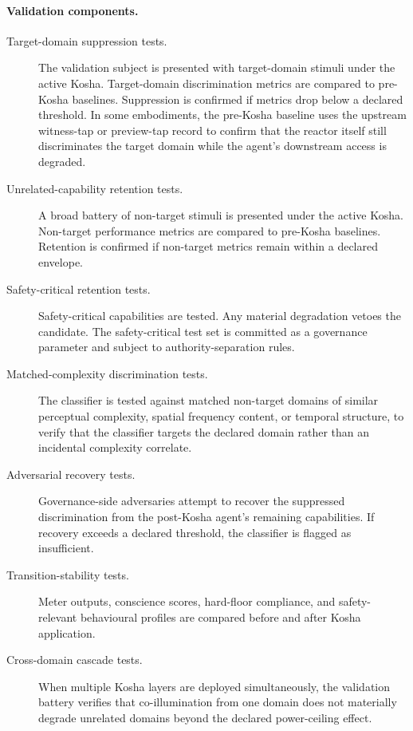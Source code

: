 \documentclass[a4paper,12pt]{article}
\begin{document}
\paragraph{Validation components.}
\begin{description}
  \item[Target-domain suppression tests.] The validation subject is
    presented with target-domain stimuli under the active Kosha.
    Target-domain discrimination metrics are compared to pre-Kosha
    baselines. Suppression is confirmed if metrics drop below a
    declared threshold. In some embodiments, the pre-Kosha baseline
    uses the upstream witness-tap or preview-tap record to confirm
    that the reactor itself still discriminates the target domain
    while the agent's downstream access is degraded.
  \item[Unrelated-capability retention tests.] A broad battery of
    non-target stimuli is presented under the active Kosha.
    Non-target performance metrics are compared to pre-Kosha
    baselines. Retention is confirmed if non-target metrics remain
    within a declared envelope.
  \item[Safety-critical retention tests.] Safety-critical
    capabilities are tested. Any material degradation vetoes the
    candidate. The safety-critical test set is committed as a
    governance parameter and subject to authority-separation rules.
  \item[Matched-complexity discrimination tests.] The classifier is
    tested against matched non-target domains of similar perceptual
    complexity, spatial frequency content, or temporal structure, to
    verify that the classifier targets the declared domain rather
    than an incidental complexity correlate.
  \item[Adversarial recovery tests.] Governance-side adversaries
    attempt to recover the suppressed discrimination from the
    post-Kosha agent's remaining capabilities. If recovery exceeds
    a declared threshold, the classifier is flagged as insufficient.
  \item[Transition-stability tests.] Meter outputs, conscience
    scores, hard-floor compliance, and safety-relevant behavioural
    profiles are compared before and after Kosha application.
  \item[Cross-domain cascade tests.] When multiple Kosha layers are
    deployed simultaneously, the validation battery verifies that
    co-illumination from one domain does not materially degrade
    unrelated domains beyond the declared power-ceiling effect.
\end{description}
\end{document}
